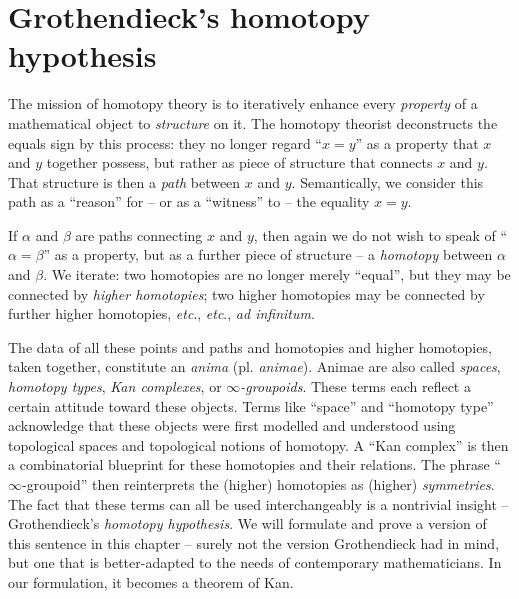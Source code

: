 
\chapter{Grothendieck's homotopy hypothesis}%
\label{cha:Grothendieck's homotopy hypothesis}

The mission of homotopy theory is to iteratively enhance every \emph{property} of a mathematical object to \emph{structure} on it.
The homotopy theorist deconstructs the equals sign by this process:
they no longer regard \enquote{$x = y$} as a property that $x$ and $y$ together possess,
but rather as piece of structure that connects $x$ and $y$.
That structure is then a \emph{path} between $x$ and $y$.
Semantically, we consider this path as a \enquote{reason} for -- or as a \enquote{witness} to -- the equality $x = y$.

If $\alpha$ and $\beta$ are paths connecting $x$ and $y$,
then again we do not wish to speak of \enquote{$\alpha = \beta$} as a property,
but as a further piece of structure -- a \emph{homotopy} between $\alpha$ and $\beta$.
We iterate: two homotopies are no longer merely \enquote{equal}, but they may be connected by \emph{higher homotopies};
two higher homotopies may be connected by further higher homotopies, \emph{etc}., \emph{etc}., \emph{ad infinitum}.

The data of all these points and paths and homotopies and higher homotopies, taken together, constitute an \emph{anima} (pl. \emph{animae}).
Animae are also called \emph{spaces}, \emph{homotopy types}, \emph{Kan complexes}, or \emph{$\infty$-groupoids}.
These terms each reflect a certain attitude toward these objects.
Terms like \enquote{space} and \enquote{homotopy type} acknowledge that these objects were first modelled and understood using topological spaces and topological notions of homotopy.
A \enquote{Kan complex} is then a combinatorial blueprint for these homotopies and their relations.
The phrase \enquote{$\infty$-groupoid} then reinterprets the (higher) homotopies as (higher) \emph{symmetries}.
The fact that these terms can all be used interchangeably is a nontrivial insight -- Grothendieck's \emph{homotopy hypothesis}.
We will formulate and prove a version of this sentence in this chapter -- surely not the version Grothendieck had in mind,
but one that is better-adapted to the needs of contemporary mathematicians.
In our formulation, it becomes a theorem of Kan.

